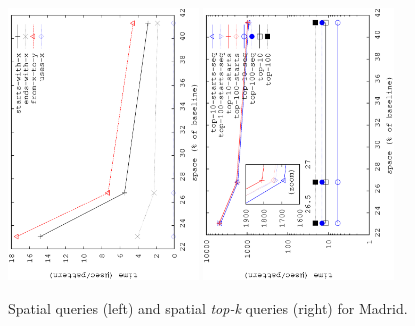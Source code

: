 \begin{figure}[htb]
	\begin{center}
		{\includegraphics[angle=-90,width=0.45\textwidth]{figures_synt/madrid_spatial.eps}}
		{\includegraphics[angle=-90,width=0.45\textwidth]{figures_synt/madrid_spatial_topk.eps}}
	\end{center}
	\vspace{-0.3cm}
	\caption{Spatial queries (left) and spatial {\em top-k} queries (right) for Madrid.}
	\label{fig:madridsp}
	\vspace{-0.3cm}





\end{figure}
